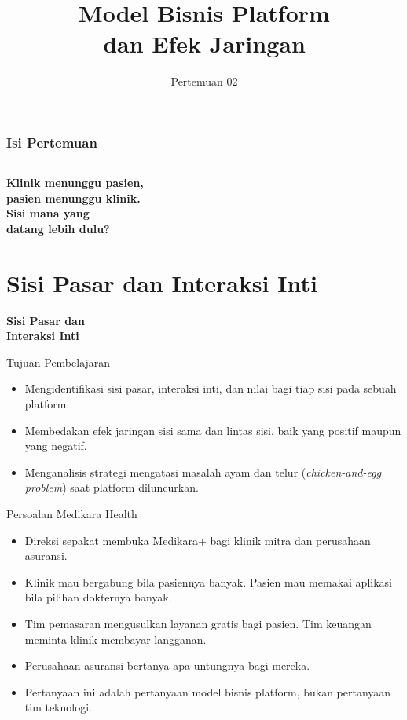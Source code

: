 \documentclass[aspectratio=169, table, 12pt]{beamer}
\title{\Huge Model Bisnis Platform\\ \vspace{10pt} dan Efek Jaringan}
\date{Pertemuan 02}
\begin{document}
\frame{\titlepage}

\begin{frame}
  \frametitle{Isi Pertemuan}
  \vspace{14pt}
  \begin{columns}[t]
    {\small\tableofcontents[sections={1-3}]}

    {\small\tableofcontents[sections={4-5}]}
  \end{columns}
\end{frame}

\begin{frame}{\hfill}
  \centering
  \Huge{\textbf{Klinik menunggu pasien,\\pasien menunggu klinik.\\Sisi mana yang\\datang lebih dulu?}}
\end{frame}

\section{Sisi Pasar dan Interaksi Inti}

\begin{frame}{\hfill}
  \centering
  \Huge{\textbf{Sisi Pasar dan\\Interaksi Inti}}
\end{frame}

\begin{frame}{{\Large Tujuan Pembelajaran}}
  \vspace{10pt}
  \begin{itemize}
    \item Mengidentifikasi sisi pasar, interaksi inti, dan nilai bagi tiap sisi pada sebuah platform.
    \item Membedakan efek jaringan sisi sama dan lintas sisi, baik yang positif maupun yang negatif.
    \item Menganalisis strategi mengatasi masalah ayam dan telur (\textit{chicken-and-egg problem}) saat platform diluncurkan.
  \end{itemize}
\end{frame}

\begin{frame}{{\Large Persoalan Medikara Health}}
  \vspace{10pt}
  \begin{itemize}
    \item Direksi sepakat membuka Medikara+ bagi klinik mitra dan perusahaan asuransi.
    \item Klinik mau bergabung bila pasiennya banyak. Pasien mau memakai aplikasi bila pilihan dokternya banyak.
    \item Tim pemasaran mengusulkan layanan gratis bagi pasien. Tim keuangan meminta klinik membayar langganan.
    \item Perusahaan asuransi bertanya apa untungnya bagi mereka.
    \item Pertanyaan ini adalah pertanyaan model bisnis platform, bukan pertanyaan tim teknologi.
  \end{itemize}
\end{frame}
\end{document}
